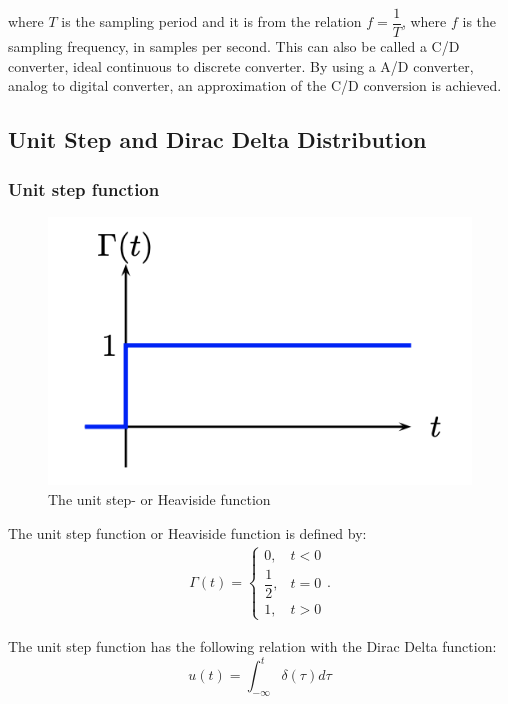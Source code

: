 where $T$ is the sampling period and it is from the relation $f=\dfrac{1}{T}$, where $f$ is the sampling frequency, in samples per second. This can also be called a C/D converter, ideal continuous to discrete converter. 
By using a A/D converter, analog to digital converter, an approximation of the C/D conversion is achieved. \cite[p. 140-142]{DiscreteTimeSignal}\\

\subsection{Unit Step and Dirac Delta Distribution}
\subsubsection{Unit step function}
\begin{figure}[H]
    \centering
    \includegraphics[scale=0.6]{figures/unit_step_func.png}
    \caption{The unit step- or Heaviside function}
    \label{fig:unit_step_function}
\end{figure}

The unit step function or Heaviside function is defined by:
\begin{align*}
\Gamma(t) =
    \begin{cases}
    0,& t<0\\
    \dfrac{1}{2}, & t=0\\
    1, & t>0
\end{cases}.
\end{align*}


\noindent The unit step function has the following relation with the Dirac Delta function:
$$u(t)=\int_{-\infty}^{t}\delta(\tau)d\tau$$

